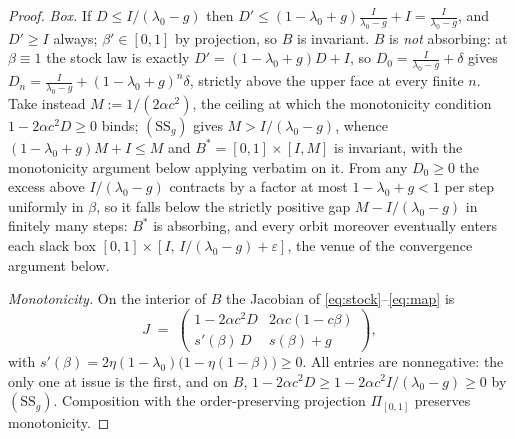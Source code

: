 \documentclass[11pt]{article}
\theoremstyle{definition}
\theoremstyle{remark}
\numberwithin{equation}{section}
\begin{document}
\begin{proof}
\emph{Box.} If $D\le I/(\lambda_0-g)$ then $D'\le(1-\lambda_0+g)\tfrac{I}{\lambda_0-g}+I=\tfrac{I}{\lambda_0-g}$, and $D'\ge I$ always; $\beta'\in[0,1]$ by projection, so $B$ is invariant. $B$ is \emph{not} absorbing: at $\beta\equiv1$ the stock law is exactly $D'=(1-\lambda_0+g)D+I$, so $D_0=\tfrac{I}{\lambda_0-g}+\delta$ gives $D_n=\tfrac{I}{\lambda_0-g}+(1-\lambda_0+g)^n\delta$, strictly above the upper face at every finite $n$. Take instead $M:=1/(2\alpha c^2)$, the ceiling at which the monotonicity condition $1-2\alpha c^2D\ge0$ binds; $(\mathrm{SS}_g)$ gives $M>I/(\lambda_0-g)$, whence $(1-\lambda_0+g)M+I\le M$ and $B^\ast=[0,1]\times[I,M]$ is invariant, with the monotonicity argument below applying verbatim on it. From any $D_0\ge0$ the excess above $I/(\lambda_0-g)$ contracts by a factor at most $1-\lambda_0+g<1$ per step uniformly in $\beta$, so it falls below the strictly positive gap $M-I/(\lambda_0-g)$ in finitely many steps: $B^\ast$ is absorbing, and every orbit moreover eventually enters each slack box $[0,1]\times[I,\,I/(\lambda_0-g)+\varepsilon]$, the venue of the convergence argument below.

\emph{Monotonicity.} On the interior of $B$ the Jacobian of \eqref{eq:stock}--\eqref{eq:map} is
\[
J \;=\;
\begin{pmatrix}
1-2\alpha c^2 D & 2\alpha c(1-c\beta)\\
s'(\beta)\,D & s(\beta)+g
\end{pmatrix},
\]
with $s'(\beta)=2\eta(1-\lambda_0)\bigl(1-\eta(1-\beta)\bigr)\ge 0$. All entries are nonnegative: the only one at issue is the first, and on $B$, $1-2\alpha c^2 D \ge 1-2\alpha c^2 I/(\lambda_0-g)\ge 0$ by $(\mathrm{SS}_g)$. Composition with the order-preserving projection $\Pi_{[0,1]}$ preserves monotonicity.


\end{proof}
\end{document}

